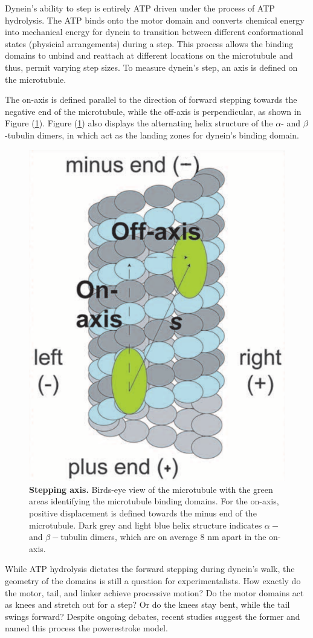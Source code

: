 Dynein's ability to step is entirely ATP driven under the process of ATP hydrolysis. The ATP binds onto the motor domain and converts chemical energy into mechanical energy for dynein to transition between different conformational states (physicial arrangements) during a step. This process allows the binding domains to unbind and reattach at different locations on the microtubule and thus, permit varying step sizes. To measure dynein's step, an axis is defined on the microtubule.

The on-axis is defined parallel to the direction of forward stepping towards the negative end of the microtubule, while the off-axis is perpendicular, as shown in Figure (\ref{fig:axis}). Figure (\ref{fig:axis}) also displays the alternating helix structure of the $\alpha$- and $\beta$-tubulin dimers, in which act as the landing zones for dynein's binding domain.  

\begin{figure}[H]
	\centering
	\includegraphics[width=0.3\columnwidth]{Figures/Onaxis.png}
	\caption[Stepping Axis]{\textbf{Stepping axis.} Birds-eye view of the microtubule with the green areas identifying the microtubule binding domains. For the on-axis, positive displacement is defined towards the minus end of the microtubule. Dark grey and light blue helix structure indicates $\alpha-$ and $\beta-$tubulin dimers, which are on average 8 nm apart in the on-axis. \cite{Dewitt2012} }
	\label{fig:axis}
\end{figure}

While ATP hydrolysis dictates the forward stepping during dynein's walk, the geometry of the domains is still a question for experimentalists. How exactly do the motor, tail, and linker achieve processive motion? Do the motor domains act as knees and stretch out for a step? Or do the knees stay bent, while the tail swings forward? Despite ongoing debates, recent studies suggest the former and named this process the powerestroke model. 



